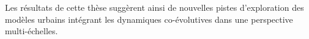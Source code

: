 \documentclass[9pt]{article}
\begin{document}
Les résultats de cette thèse suggèrent ainsi de nouvelles pistes d'exploration des modèles urbains intégrant les dynamiques co-évolutives dans une perspective multi-échelles.














%
%

\end{document}
